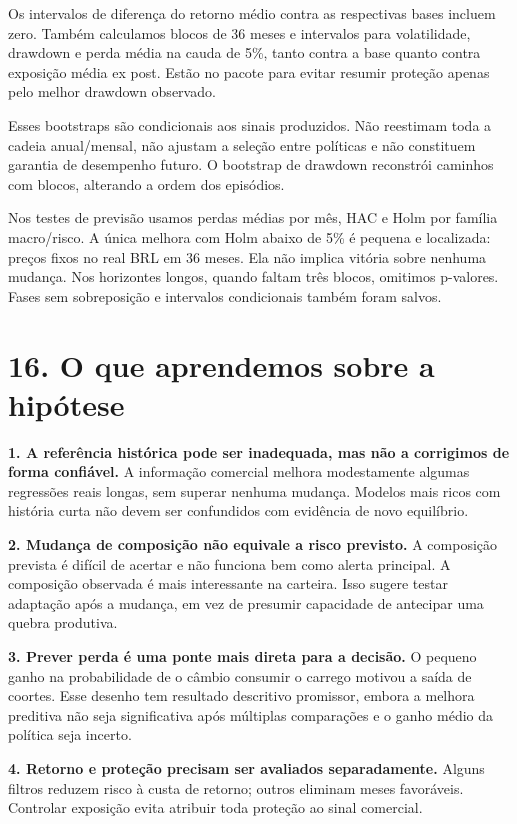\documentclass[11pt,a4paper]{article}
\begin{document}
Os intervalos de diferença do retorno médio contra as respectivas bases incluem zero. Também calculamos blocos de 36 meses e intervalos para volatilidade, drawdown e perda média na cauda de 5\%, tanto contra a base quanto contra exposição média ex post. Estão no pacote para evitar resumir proteção apenas pelo melhor drawdown observado.

Esses bootstraps são condicionais aos sinais produzidos. Não reestimam toda a cadeia anual/mensal, não ajustam a seleção entre políticas e não constituem garantia de desempenho futuro. O bootstrap de drawdown reconstrói caminhos com blocos, alterando a ordem dos episódios.

Nos testes de previsão usamos perdas médias por mês, HAC e Holm por família macro/risco. A única melhora com Holm abaixo de 5\% é pequena e localizada: preços fixos no real BRL em 36 meses. Ela não implica vitória sobre nenhuma mudança. Nos horizontes longos, quando faltam três blocos, omitimos p-valores. Fases sem sobreposição e intervalos condicionais também foram salvos.

\clearpage
\section*{16. O que aprendemos sobre a hipótese}

\textbf{1. A referência histórica pode ser inadequada, mas não a corrigimos de forma confiável.} A informação comercial melhora modestamente algumas regressões reais longas, sem superar nenhuma mudança. Modelos mais ricos com história curta não devem ser confundidos com evidência de novo equilíbrio.

\textbf{2. Mudança de composição não equivale a risco previsto.} A composição prevista é difícil de acertar e não funciona bem como alerta principal. A composição observada é mais interessante na carteira. Isso sugere testar adaptação após a mudança, em vez de presumir capacidade de antecipar uma quebra produtiva.

\textbf{3. Prever perda é uma ponte mais direta para a decisão.} O pequeno ganho na probabilidade de o câmbio consumir o carrego motivou a saída de coortes. Esse desenho tem resultado descritivo promissor, embora a melhora preditiva não seja significativa após múltiplas comparações e o ganho médio da política seja incerto.

\textbf{4. Retorno e proteção precisam ser avaliados separadamente.} Alguns filtros reduzem risco à custa de retorno; outros eliminam meses favoráveis. Controlar exposição evita atribuir toda proteção ao sinal comercial.
\end{document}
